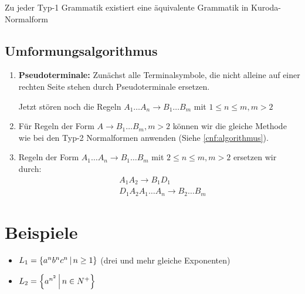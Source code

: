 Zu jeder Typ-1 Grammatik existiert eine äquivalente Grammatik in Kuroda-Normalform


\subsection{Umformungsalgorithmus}
\begin{enumerate}
	\item \textbf{Pseudoterminale:}
	Zunächst alle Terminalsymbole, die nicht alleine auf einer rechten Seite stehen durch Pseudoterminale ersetzen.

	Jetzt stören noch die Regeln $A_1\ldots A_n\rightarrow B_1\ldots B_m$ mit $1\leq n\leq m, m>2$

	\item Für Regeln der Form $A\rightarrow B_1\ldots B_m, m>2$ können wir die gleiche Methode wie bei den Typ-2 Normalformen anwenden (Siehe \autoref{cnf:algorithmus}).

	\item Regeln der Form $A_1\ldots A_n\rightarrow B_1\ldots B_m$ mit $2\leq n\leq m, m>2$ ersetzen wir durch:
	\begin{align*}
		&A_1A_2\rightarrow B_1D_1\\
		&D_1A_2A_1\ldots A_n\rightarrow B_2\ldots B_m
	\end{align*}
\end{enumerate}

\section{Beispiele}
\begin{itemize}
	\item $L_1=\left\{ a^nb^nc^n \,\middle|\, n\geq 1 \right\}$ (drei und mehr gleiche Exponenten)
	\item $L_2=\left\{ a^{n^2} \,\middle|\, n\in N^+ \right\}$
\end{itemize}
